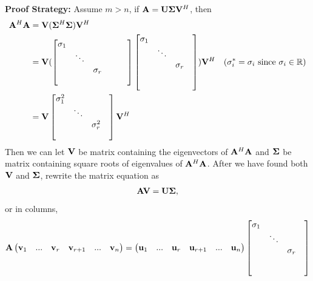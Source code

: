 \noindent\textbf{Proof Strategy:} 
Assume $m>n$,
if $\bold{A}=\bold{U}\bold{\Sigma}\bold{V}^H$,
then 
\begin{align*}
    \bold{A}^H\bold{A}&=\bold{V}(\bold{\Sigma}^H\bold{\Sigma})\bold{V}^H\\
                        &=\bold{V}(\begin{bmatrix}
                            \sigma_{1} & & & & &\\
                            & \ddots & & & &\\
                            & & \sigma_{r} & & &\\
                            & & & & & \\
                          \end{bmatrix}\begin{bmatrix}
                            \sigma_{1} & & &\\
                            & \ddots & &\\
                            & & \sigma_{r} &\\
                            & & & \\
                            & & &
                          \end{bmatrix})\bold{V}^H & (\sigma_i^*=\sigma_i \text{ since }\sigma_i \in \mathbb{R})\\
                        &=\bold{V}
                          \begin{bmatrix}
                            \sigma_{1}^2 & & &\\
                            & \ddots & &\\
                            & & \sigma_{r}^2 &\\
                            & & & \\
                          \end{bmatrix}\bold{V}^H
\end{align*}
Then we can let $\bold{V}$ be matrix containing the eigenvectors of $\bold{A}^H\bold{A}$
and $\bold{\Sigma}$ be matrix containing square roots of eigenvalues of $\bold{A}^H\bold{A}$.
After we have found both $\bold{V}$ and $\bold{\Sigma}$, rewrite the matrix equation as
\begin{align*}
    \bold{AV}=\bold{U\Sigma},
\end{align*}  
or in columns,
\begin{align*}
    \bold{A}\begin{pmatrix}
        \bold{v}_1&...&\bold{v}_r&\bold{v}_{r+1}&...&\bold{v}_n
    \end{pmatrix}
    = \begin{pmatrix}
        \bold{u}_1&...&\bold{u}_r&\bold{u}_{r+1}&...&\bold{u}_n
    \end{pmatrix}
    \begin{bmatrix}
        \sigma_{1} & & &\\
        & \ddots & &\\
        & & \sigma_{r} &\\
        & & & \\
        & & &
      \end{bmatrix}
\end{align*}
